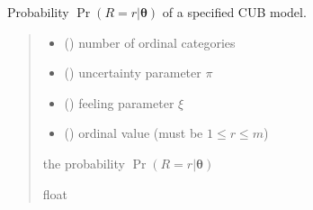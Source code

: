 \documentclass[letterpaper,10pt,english]{sphinxmanual}
\begin{document}
\begin{fulllineitems}
\label{\detokenize{cubmods:cubmods.cub.proba}}
\pysigstartsignatures
{}
\pysigstopsignatures
\sphinxAtStartPar
Probability \(\Pr(R = r | \pmb\theta)\) of a specified CUB model.
\begin{quote}\begin{description}
\begin{itemize}
\item {} 
\sphinxAtStartPar
{} () \textendash{} number of ordinal categories

\item {} 
\sphinxAtStartPar
{} () \textendash{} uncertainty parameter \(\pi\)

\item {} 
\sphinxAtStartPar
{} () \textendash{} feeling parameter \(\xi\)

\item {} 
\sphinxAtStartPar
{} () \textendash{} ordinal value (must be \(1 \leq r \leq m\))

\end{itemize}

\sphinxAtStartPar
the probability \(\Pr(R = r | \pmb\theta)\)

\sphinxAtStartPar
float

\end{description}\end{quote}

\end{fulllineitems}

\end{document}
